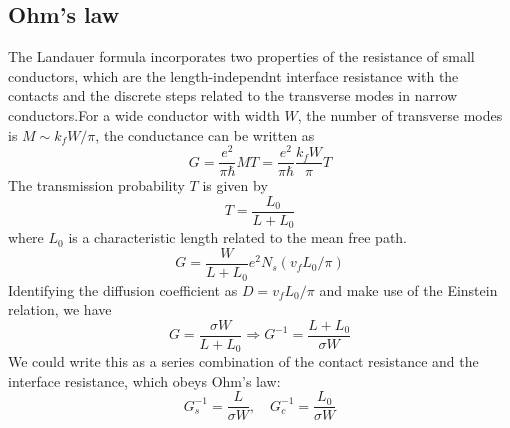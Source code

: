 \documentclass[11pt,a4paper]{book}
\theoremstyle{plain}
\theoremstyle{definition}
\theoremstyle{remark}
\begin{document}
\subsection{Ohm's law}
The Landauer formula incorporates two properties of the resistance of small conductors, which are the length-independnt interface resistance with the contacts and the discrete steps related to the transverse modes in narrow conductors.For a wide conductor with width $W$, the number of transverse modes is $M \sim k_f W/\pi$, the conductance can be written as
\begin{equation}
    G = \frac{e^2}{\pi \hbar} M T = \frac{e^2}{\pi \hbar} \frac{k_f W}{\pi} T
\end{equation}
The transmission probability $T$ is given by
\begin{equation}
    T = \frac{L_0}{L + L_0}
\end{equation}
where $L_0$ is a characteristic length related to the mean free path.
\begin{equation}
    G = \frac{W}{L + L_0} e^2 N_s (v_f L_0/\pi)
\end{equation}
Identifying the diffusion coefficient as $D = v_f L_0/\pi$ and make use of the Einstein relation, we have
\begin{equation}
    G = \frac{\sigma W}{L + L_0} \Rightarrow G^{-1} = \frac{L+L_0}{\sigma W}
\end{equation}
We could write this as a series combination of the contact resistance and the interface resistance, which obeys Ohm's law:
\begin{equation}
    G_s^{-1} = \frac{L}{\sigma W}, \quad G_c^{-1} = \frac{L_0}{\sigma W}
\end{equation}
\end{document}
